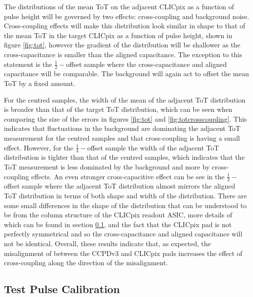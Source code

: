 The distributions of the mean ToT on the adjacent CLICpix as a function of pulse height will be governed by two effects: cross-coupling and background noise.  Cross-coupling effects will make this distribution look similar in shape to that of the mean ToT in the target CLICpix as a function of pulse height, shown in figure \ref{fig:tot}, however the gradient of the distribution will be shallower as the cross-capacitance is smaller than the aligned capacitance.  The exception to this statement is the $\frac{1}{2}-$offset sample where the cross-capacitance and aligned capacitance will be comparable.  The background will again act to offset the mean ToT by a fixed amount.  

For the centred samples, the width of the mean of the adjacent ToT distribution is broader than that of the target ToT distribution, which can be seen when comparing the size of the errors in figures \ref{fig:tot} and \ref{fig:totcrosscoupling}.  This indicates that fluctuations in the background are dominating the adjacent ToT measurement for the centred samples and that cross-coupling is having a small effect.  However, for the $\frac{1}{4}-$offset sample the width of the adjacent ToT distribution is tighter than that of the centred samples, which indicates that the ToT measurement is less dominated by the background and more by cross-coupling effects.  An even stronger cross-capacitive effect can be see in the $\frac{1}{2}-$offset sample where the adjacent ToT distribution almost mirrors the aligned ToT distribution in terms of both shape and width of the distribution.  There are some small differences in the shape of the distribution that can be understood to be from the column structure of the CLICpix readout ASIC, more details of which can be found in section \ref{sec:testpulsecalibration}, and the fact that the CLICpix pad is not perfectly symmetrical and so the cross-capacitance and aligned capacitance will not be identical.  Overall, these results indicate that, as expected, the misalignment of between the CCPDv3 and CLICpix pads increases the effect of cross-coupling along the direction of the misalignment.


\subsection{Test Pulse Calibration}
\label{sec:testpulsecalibration}

